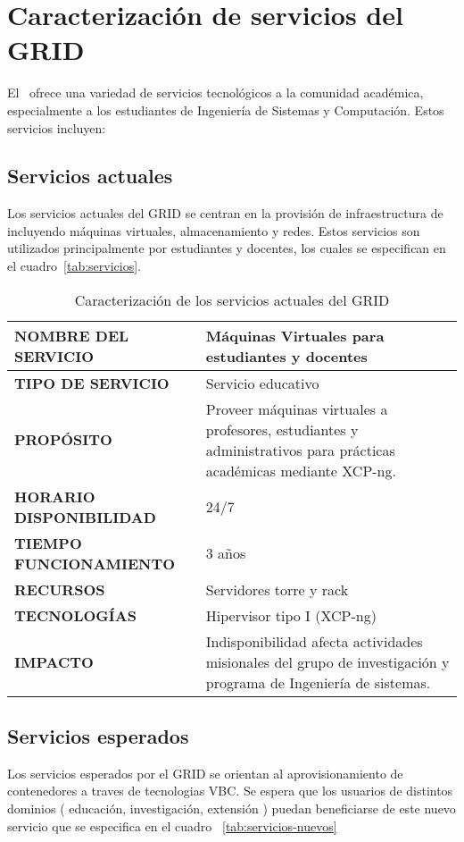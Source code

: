 \section{Caracterización de servicios del GRID}
El \GRID\ ofrece una variedad de servicios tecnológicos a la comunidad académica, especialmente a los estudiantes de Ingeniería de Sistemas y Computación. Estos servicios incluyen:

\subsection{Servicios actuales}
Los servicios actuales del GRID se centran en la provisión de infraestructura de \TI\, incluyendo máquinas virtuales, almacenamiento y redes. Estos servicios son utilizados principalmente por estudiantes y docentes, los cuales se especifican en el cuadro~\ref{tab:servicios}.

\begin{table}[H]
\centering
\renewcommand{\arraystretch}{1.2}
\setlength{\tabcolsep}{3pt}
\tiny
\begin{tabularx}{\textwidth}{|>{\raggedright\arraybackslash}p{}|X|}
\hline
\textbf{NOMBRE DEL SERVICIO} & Máquinas Virtuales para estudiantes y docentes \\
\hline
\textbf{TIPO DE SERVICIO} & Servicio educativo \\
\hline
\textbf{PROPÓSITO} & Proveer máquinas virtuales a profesores, estudiantes y administrativos para prácticas académicas mediante XCP-ng. \\
\hline
\textbf{HORARIO DISPONIBILIDAD} & 24/7 \\
\hline
\textbf{TIEMPO FUNCIONAMIENTO} & 3 años \\
\hline
\textbf{RECURSOS} & Servidores torre y rack \\
\hline
\textbf{TECNOLOGÍAS} & Hipervisor tipo I (XCP-ng) \\
\hline
\textbf{IMPACTO} & Indisponibilidad afecta actividades misionales del grupo de investigación y programa de Ingeniería de sistemas. \\
\hline
\end{tabularx}
\caption{Caracterización de los servicios actuales del GRID}
\end{table}

\subsection{Servicios esperados}
Los servicios esperados por el GRID se orientan al aprovisionamiento de contenedores a traves de tecnologias VBC. Se espera que los usuarios de distintos dominios ( educación, investigación, extensión ) puedan beneficiarse de este nuevo servicio que se especifica en el cuadro ~\ref{tab:servicios-nuevos}

